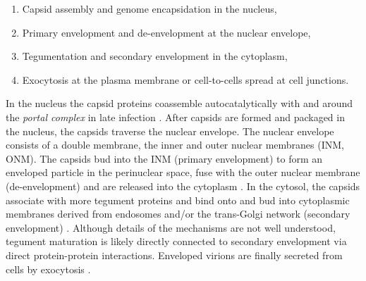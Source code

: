 \begin{samepage}
  \begin{enumerate}
    \item Capsid assembly and genome encapsidation in the nucleus,
    \item Primary envelopment and de-envelopment at the nuclear envelope,
    \item Tegumentation and secondary envelopment in the cytoplasm,
    \item Exocytosis at the plasma membrane or cell-to-cells spread at cell junctions.
  \end{enumerate}
\end{samepage}

In the nucleus the capsid proteins coassemble autocatalytically with and around the \emph{portal complex} in late infection \cite{[4]}.
After capsids are formed and packaged in the nucleus, the capsids %
traverse the nuclear envelope.
The nuclear envelope consists of a double membrane, the inner and outer nuclear membranes (INM, ONM).
The capsids bud into the INM (primary envelopment) to form an enveloped particle in the perinuclear space, fuse with the outer nuclear membrane (de-envelopment) and are released into the cytoplasm \cite{[12]}. %
In the cytosol, the capsids associate with more tegument proteins and bind onto and bud into cytoplasmic membranes derived from endosomes and/or the trans-Golgi network (secondary envelopment) \cite{[13, 14]}.
Although details of the mechanisms are not well understood, tegument maturation is likely directly connected to secondary envelopment via direct protein-protein interactions.
Enveloped virions are finally secreted from cells by exocytosis \cite{[15, 16]}.


